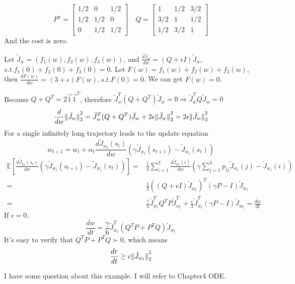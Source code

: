 \begin{example}
    \[
        P^{\pi} =
        \begin{bmatrix}
            1/2 & 0 & 1/2 \\
            1/2 & 1/2 & 0 \\
            0 & 1/2 & 1/2
        \end{bmatrix}
        \quad
        Q =
        \begin{bmatrix}
            1 & 1/2 & 3/2 \\
            3/2 & 1 & 1/2 \\
            1/2 & 3/2 & 1
        \end{bmatrix}
    \]
    And the cost is zero.

    Let $ \tilde J_{w} = (f_1(w), f_2(w), f_3(w)) $, and $ \frac{d \tilde J_{w}}{d w} = (Q + \epsilon I) \tilde J_w  $, $ {s.t.} f_1(0) + f_2(0) + f_3(0) = 0$.
    Let $ F(w) = f_1(w) + f_2(w) + f_3(w) $, then $ \frac{d F(w)}{d w} = (3 + \epsilon) F(w), s.t. F(0) = 0 $. We can get $ F(w) = 0 $.
    
    Because $ Q + Q^T = 2 \vec{1} {\vec{1}}^{T} $, therefore $ \tilde J _{w}^{T} (Q + Q^T) \tilde J_w = 0 \Rightarrow \tilde J^{T}_{w} Q \tilde J_{w} = 0 $
    \[
        \frac{d}{dw} {\Arrowvert \tilde J_w \Arrowvert}_2^2 = \tilde J_w^T (Q + Q^T) \tilde J_w + 2\epsilon {\Arrowvert \tilde J_w \Arrowvert}_2^2 = 2\epsilon {\Arrowvert \tilde J_w \Arrowvert}_2^2
    \]
    For a single infinitely long trajectory leads to the update equation
    \[
        w_{t+1} = w_{t} + \alpha_t\frac{d \tilde J_{w_t} (s_t)}{ d w} (\gamma \tilde J_{w_t}(s_{t+1}) - \tilde J_{w_t} (s_t))
    \]
    \begin{align*}
        \mathbb{E}\left[ \frac{d \tilde J_{w_t} (s_t)}{d w} (\gamma \tilde J_{w_t}(s_{t+1}) - \tilde J_{w_t} (s_t)) \right] 
        =& \frac{1}{3} \sum^{3}_{i=1} \frac{d \tilde J_{w_t}(i)}{d w} \left( \gamma \sum^{3}_{j=1} p_{ij} \tilde J_{w_t}(j) - \tilde J_{w_t}(i) \right) \\
        =& \frac{1}{3} {\left( (Q + \epsilon I ) \tilde J_{w_t} \right)}^{T} (\gamma P - I) \tilde J_{w_{t}}\\
        =& \frac{\gamma}{3} \tilde J_{w_t}^T Q^T P \tilde J^{T}_{w_t} + \frac{\epsilon}{3} \tilde J^{T}_{w_t}(\gamma P - I) \tilde J_{w_t} = \frac{d w}{dt} 
    \end{align*}
    If $ \epsilon = 0 $, 
    \[
         \frac{dw}{dt} = \frac{\gamma}{6} \tilde J^{T}_{w_t} \left( Q^T P + P^T Q \right) \tilde J_{w_t} 
    \]
    It's easy to verify that $ Q^T P + P^T Q \succ 0 $, which means
    \[
        \frac{dr}{dt} \ge c {\Arrowvert \tilde J_{w_t} \Arrowvert}_2^2
    \]
\end{example}
I have some question about this example. I will refer to Chapter4 {ODE}.

